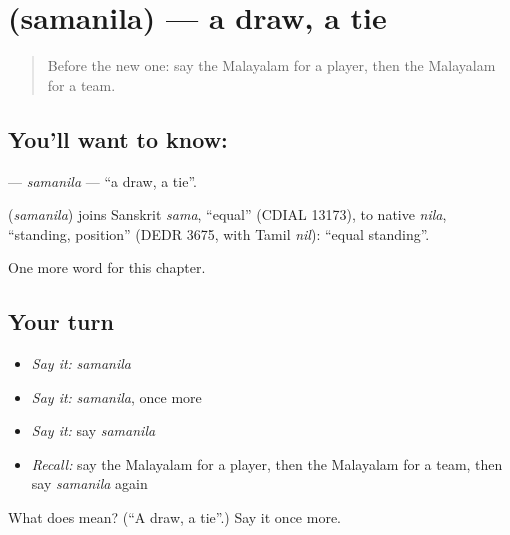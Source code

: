 \section[\texorpdfstring{\ml{സമനില} (samanila)}{സമനില (samanila)}]{ (samanila) — a draw, a tie}

\label{lesson:ML-C215-samanila}



\begin{quote}
Before the new one: say the Malayalam for a player, then the Malayalam for a team.
\end{quote}

\subsection*{You'll want to know: }
\textbf{} — \emph{samanila} — \textquotedblleft{}a draw, a tie\textquotedblright{}.

\begin{cousinweb}
\textbf{} (\emph{samanila}) joins Sanskrit \emph{sama}, \textquotedblleft{}equal\textquotedblright{} (CDIAL 13173), to native \emph{nila}, \textquotedblleft{}standing, position\textquotedblright{} (DEDR 3675, with Tamil \emph{nil}): \textquotedblleft{}equal standing\textquotedblright{}.
\end{cousinweb}

\begin{grammarlens}[title={What you've built}]
One more word for this chapter.
\end{grammarlens}

\subsection*{Your turn}
\begin{itemize}
\raggedright
  \item \emph{Say it:} \emph{samanila}
  \item \emph{Say it:} \emph{samanila}, once more
  \item \emph{Say it:} say \emph{samanila}
  \item \emph{Recall:} say the Malayalam for a player, then the Malayalam for a team, then say \emph{samanila} again
\end{itemize}

\begin{tcolorbox}[breakable,colback=teal!4,colframe=teal!35!black,title={Before you move on}]
What does  mean? (\textquotedblleft{}A draw, a tie\textquotedblright{}.) Say it once more.
\end{tcolorbox}

